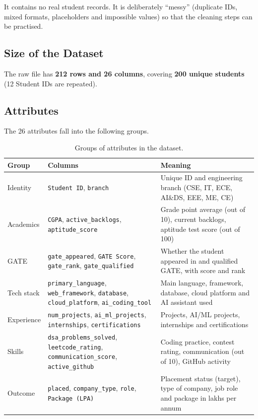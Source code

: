 \documentclass[12pt,a4paper]{article}
\begin{document}
It contains no real student records. It is deliberately ``messy'' (duplicate IDs, mixed formats, placeholders and impossible values) so that the cleaning steps can be practised.

\subsection{Size of the Dataset}
The raw file has \textbf{212 rows and 26 columns}, covering \textbf{200 unique students} (12 Student IDs are repeated).

\subsection{Attributes}
The 26 attributes fall into the following groups.

\begin{table}[H]
\centering
\small
\renewcommand{\arraystretch}{1.2}
\begin{tabular}{@{}p{3.3cm}p{5.2cm}p{6.2cm}@{}}
\toprule
\textbf{Group} & \textbf{Columns} & \textbf{Meaning} \\
\midrule
Identity & \texttt{Student ID}, \texttt{branch} & Unique ID and engineering branch (CSE, IT, ECE, AI\&DS, EEE, ME, CE) \\
Academics & \texttt{CGPA}, \texttt{active\_backlogs}, \texttt{aptitude\_score} & Grade point average (out of 10), current backlogs, aptitude test score (out of 100) \\
GATE & \texttt{gate\_appeared}, \texttt{GATE Score}, \texttt{gate\_rank}, \texttt{gate\_qualified} & Whether the student appeared in and qualified GATE, with score and rank \\
Tech stack & \texttt{primary\_language}, \texttt{web\_framework}, \texttt{database}, \texttt{cloud\_platform}, \texttt{ai\_coding\_tool} & Main language, framework, database, cloud platform and AI assistant used \\
Experience & \texttt{num\_projects}, \texttt{ai\_ml\_projects}, \texttt{internships}, \texttt{certifications} & Projects, AI/ML projects, internships and certifications \\
Skills & \texttt{dsa\_problems\_solved}, \texttt{leetcode\_rating}, \texttt{communication\_score}, \texttt{active\_github} & Coding practice, contest rating, communication (out of 10), GitHub activity \\
Outcome & \texttt{placed}, \texttt{company\_type}, \texttt{role}, \texttt{Package (LPA)} & Placement status (target), type of company, job role and package in lakhs per annum \\
\bottomrule
\end{tabular}
\caption{Groups of attributes in the dataset.}
\end{table}
\end{document}
